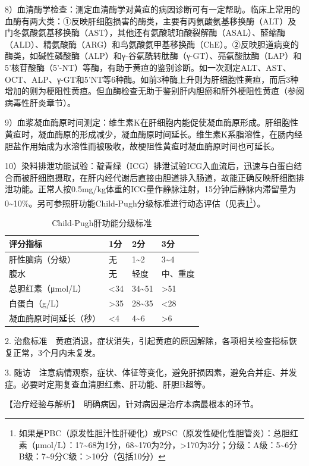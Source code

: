 8）血清酶学检查：测定血清酶学对黄疸的病因诊断可有一定帮助。临床上常用的血酶有两大类：①反映肝细胞损害的酶类，主要有丙氨酸氨基移换酶（ALT）及门冬氨酸氨基移换酶（AST），其他还有氨酸琥珀酸裂解酶（ASAL）、醛缩酶（ALD）、精氨酸酶（ARG）和鸟氨酸氨甲基移换酶（ChE）。②反映胆道病变的酶类，如碱性磷酸酶（ALP）和γ-谷氨酰转肽酶（γ-GT）、亮氨酸肽酶（LAP）和5'核苷酸酶（5'{-}NT）等酶，有助于黄疸的鉴别诊断。如一次测定ALT、AST、OCT、ALP、γ-GT和5'NT等6种酶。如前3种酶上升则为肝细胞性黄疸，而后3种增加的则为梗阻性黄疸。但血酶检查无助于鉴别肝内胆瘀和肝外梗阻性黄疸（参阅病毒性肝炎章节）。

9）血浆凝血酶原时间测定：维生素K在肝细胞内能促使凝血酶原形成。肝细胞性黄疸时，凝血酶原的形成减少，凝血酶原时间延长。维生素K系脂溶性，在肠内经胆盐作用始成为水溶性而被吸收，故梗阻性黄疸时凝血酶原时间也可延长。

10）染料排泄功能试验：靛青绿（ICG）排泄试验ICG入血流后，迅速与白蛋白结合而被肝细胞摄取，在肝内经代谢后直接由胆道排入肠道，故能正确反映肝细胞排泄功能。正常人按0.5mg/kg体重的ICG量作静脉注射，15分钟后静脉内滞留量为0\textasciitilde{}10\%。另可参照肝功能Child-Pugh分级标准进行动态评估（见表\ref{tab3-21-1}\footnote{如果是PBC（原发性胆汁性肝硬化）或PSC（原发性硬化性胆管炎）：总胆红素（μmol/L）：17\textasciitilde{}68为1分，68\textasciitilde{}170为2分，\textgreater{}170为3分；分级：A级：5\textasciitilde{}6分　B级：7\textasciitilde{}9分C级：\textgreater{}10分（包括10分）}）。

\begin{table}[htbp]
    \centering
    \caption{Child-Pugh肝功能分级标准}
    \label{tab3-21-1}
    \begin{tabular}{llll}
\toprule
评分指标 & 1分 & 2分 & 3分\tabularnewline
\midrule
肝性脑病（分级） & 无 & 1\textasciitilde{}2 &
3\textasciitilde{}4\tabularnewline
腹水 & 无 & 轻度 & 中、重度\tabularnewline
总胆红素（μmol/L） & \textless{}34 & 34\textasciitilde{}51 &
\textgreater{}51\tabularnewline
白蛋白（g/L） & \textgreater{}35 & 28\textasciitilde{}35 &
\textless{}28\tabularnewline
凝血酶原时间延长（秒） & \textless{}4 & 4\textasciitilde{}6 &
\textgreater{}6\tabularnewline
\bottomrule
    \end{tabular}
\end{table}


2.
治愈标准　黄疸消退，症状消失，引起黄疸的原因解除，各项相关检查指标恢复正常，3个月内未复发。

3.
随访　注意病情观察，症状、体征等变化，避免肝损因素，避免合并症、并发症。必要时定期复查血清胆红素、肝功能、肝胆B超等。

【治疗经验与解析】　明确病因，针对病因是治疗本病最根本的环节。

